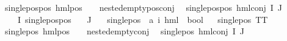 \begin{isabellebody}
{\isachardoublequoteopen}single{\isacharunderscore}{\kern0pt}pos{\isacharunderscore}{\kern0pt}pos\ {\isacharparenleft}{\kern0pt}hml{\isacharunderscore}{\kern0pt}pos\ {\isacharunderscore}{\kern0pt}\ {\isasympsi}{\isacharparenright}{\kern0pt}{\isachardoublequoteclose}\ \ {\isachardoublequoteopen}nested{\isacharunderscore}{\kern0pt}empty{\isacharunderscore}{\kern0pt}pos{\isacharunderscore}{\kern0pt}conj\ {\isasympsi}{\isachardoublequoteclose}\ {\isacharbar}{\kern0pt}\isanewline
{\isachardoublequoteopen}single{\isacharunderscore}{\kern0pt}pos{\isacharunderscore}{\kern0pt}pos\ {\isacharparenleft}{\kern0pt}hml{\isacharunderscore}{\kern0pt}conj\ I\ J\ {\isasymPhi}{\isacharparenright}{\kern0pt}{\isachardoublequoteclose}\ \ \isanewline
{\isachardoublequoteopen}{\isacharparenleft}{\kern0pt}{\isasymforall}{\isasymphi}\ {\isasymin}\ {\isacharparenleft}{\kern0pt}{\isasymPhi}\ {\isacharbackquote}{\kern0pt}I{\isacharparenright}{\kern0pt}{\isachardot}{\kern0pt}\ {\isacharparenleft}{\kern0pt}single{\isacharunderscore}{\kern0pt}pos{\isacharunderscore}{\kern0pt}pos\ {\isasymphi}{\isacharparenright}{\kern0pt}{\isacharparenright}{\kern0pt}{\isachardoublequoteclose}\isanewline
{\isachardoublequoteopen}{\isacharparenleft}{\kern0pt}{\isasymPhi}\ {\isacharbackquote}{\kern0pt}\ J{\isacharparenright}{\kern0pt}\ {\isacharequal}{\kern0pt}\ {\isacharbraceleft}{\kern0pt}{\isacharbraceright}{\kern0pt}{\isachardoublequoteclose}\isanewline
\isanewline
{}\isamarkupfalse%
\ single{\isacharunderscore}{\kern0pt}pos\ {\isacharcolon}{\kern0pt}{\isacharcolon}{\kern0pt}\ {\isachardoublequoteopen}{\isacharparenleft}{\kern0pt}{\isacharprime}{\kern0pt}a{\isacharcomma}{\kern0pt}\ {\isacharprime}{\kern0pt}i{\isacharparenright}{\kern0pt}\ hml\ {\isasymRightarrow}\ bool{\isachardoublequoteclose}\isanewline
\ \ \isanewline
{\isachardoublequoteopen}single{\isacharunderscore}{\kern0pt}pos\ TT{\isachardoublequoteclose}\ {\isacharbar}{\kern0pt}\isanewline
{\isachardoublequoteopen}single{\isacharunderscore}{\kern0pt}pos\ {\isacharparenleft}{\kern0pt}hml{\isacharunderscore}{\kern0pt}pos\ {\isacharunderscore}{\kern0pt}\ {\isasympsi}{\isacharparenright}{\kern0pt}{\isachardoublequoteclose}\ \ {\isachardoublequoteopen}nested{\isacharunderscore}{\kern0pt}empty{\isacharunderscore}{\kern0pt}conj\ {\isasympsi}{\isachardoublequoteclose}\ {\isacharbar}{\kern0pt}\isanewline
{\isachardoublequoteopen}single{\isacharunderscore}{\kern0pt}pos\ {\isacharparenleft}{\kern0pt}hml{\isacharunderscore}{\kern0pt}conj\ I\ J\ {\isasymPhi}{\isacharparenright}{\kern0pt}{\isachardoublequoteclose}\isanewline

\end{isabellebody}
